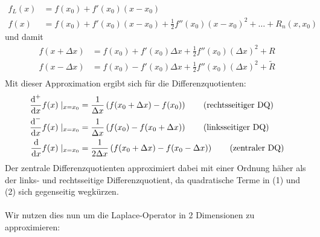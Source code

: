 \documentclass{article}
\begin{document}
\begin{egbox}
\begin{align*}
            f_L(x) &= f(x_0) + f'(x_0)(x-x_0) \\
            f(x) &= f(x_0) + f'(x_0)(x-x_0) + \tfrac{1}{2} f''(x_0)(x-x_0)^2 + \dotsc + R_n(x,x_0)
        \end{align*}
        und damit 
        \begin{align*}
            f(x+\Delta x) &= f(x_0) + f'(x_0)\Delta x + \tfrac{1}{2}f''(x_0)(\Delta x)^2 + R \tag{1}\\
            f(x-\Delta x) &= f(x_0) - f'(x_0)\Delta x + \tfrac{1}{2}f''(x_0)(\Delta x)^2 + \tilde{R} \tag{2} \\
        \end{align*}
        Mit dieser Approximation ergibt sich für die Differenzquotienten:
        \begin{align*}
            \dfrac{\text{d}^+}{\text{d} x} f(x)\mid_{x=x_0} &= \dfrac{1}{\Delta x}\left(f(x_0+\Delta x) - f(x_0)\right) 
            \tag{rechtsseitiger DQ}\\
            \dfrac{\text{d}^-}{\text{d} x} f(x)\mid_{x=x_0} &= \dfrac{1}{\Delta x}\left(f(x_0)-f(x_0+\Delta x)\right) 
            \tag{linksseitiger DQ}\\
            \dfrac{\text{d}}{\text{d} x} f(x)\mid_{x=x_0} 
            &= \dfrac{1}{2\Delta x}\left(f(x_0+\Delta x) - f(x_0-\Delta x)\right)\tag{zentraler DQ}
        \end{align*}
        Der zentrale Differenzquotienten approximiert dabei mit einer Ordnung häher als der links- und rechtsseitige 
        Differenzquotient, da quadratische Terme in (1) und (2) sich gegenseitig wegkürzen. \\ \\
        Wir nutzen dies nun um die Laplace-Operator in 2 Dimensionen zu approximieren: \\
        \begin{center}
\end{center}
\end{egbox}
\end{document}
